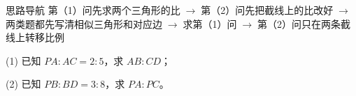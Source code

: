 \documentclass{exam-zh}
\begin{document}
\begin{eduAuxItem}{思路导航}
第（1）问先求两个三角形的比$\;\to\;$第（2）问先把截线上的比改好$\;\to\;$两类题都先写清相似三角形和对应边$\;\to\;$求第（1）问$\;\to\;$第（2）问只在两条截线上转移比例\end{eduAuxItem}




\begin{eduSubQuestionItem}{(1)}
已知 $PA:AC=2:5$，求 $AB:CD$；\end{eduSubQuestionItem}

\begin{eduDualExplain}
  \begin{eduExplainLeft}
  \end{eduExplainLeft}

  \begin{eduExplainRight}
      \begin{center}
        \begin{diagramcoltikz}{70mm}{交叉的两条截线中，仍按同一顺序找三组对应边。}
        }
        \end{diagramcoltikz}
      \end{center}
  \end{eduExplainRight}
\end{eduDualExplain}




\begin{eduSubQuestionItem}{(2)}
已知 $PB:BD=3:8$，求 $PA:PC$。\end{eduSubQuestionItem}
\end{document}

